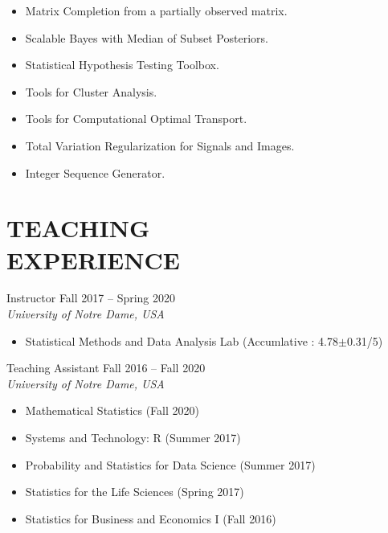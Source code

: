 \documentclass[margin, 10pt]{res} %
\begin{document}
\begin{resume}
\begin{itemize}
    \item{ Matrix Completion from a partially observed matrix.}
    \item{ Scalable Bayes with Median of Subset Posteriors.}
    \item{  Statistical Hypothesis Testing Toolbox.}
    \item{  Tools for Cluster Analysis.}
    \item{  Tools for Computational Optimal Transport.}
    \item{ Total Variation Regularization for Signals and Images.}
    \item{  Integer Sequence Generator.}
\end{itemize}
\vspace{.2cm}



 
\section{\sf TEACHING\\ EXPERIENCE}

Instructor \hfill Fall 2017 -- Spring 2020 \\
{\sl University of Notre Dame, USA}
\begin{itemize} \itemsep -2pt
	\item Statistical Methods and Data Analysis Lab (Accumlative : 4.78$\pm$0.31/5)
\end{itemize}

Teaching Assistant \hfill Fall 2016 -- Fall 2020 \\
{\sl University of Notre Dame, USA}
\begin{itemize} \itemsep -2pt
	\item Mathematical Statistics (Fall 2020)
	\item Systems and Technology: R (Summer 2017)
	\item Probability and Statistics for Data Science (Summer 2017)
	\item Statistics for the Life Sciences (Spring 2017)
	\item Statistics for Business and Economics I (Fall 2016)
\end{itemize}


\end{resume}
\end{document}
